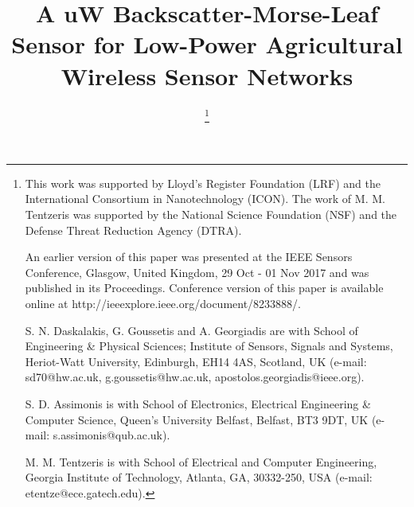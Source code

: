 \documentclass[journal]{IEEEtran}
\begin{document}
\title{A uW Backscatter-Morse-Leaf Sensor for Low-Power Agricultural Wireless Sensor Networks}


\author{

                             
\thanks{
This work was supported by Lloyd's Register Foundation (LRF) and the International Consortium in Nanotechnology (ICON). The work of M. M. Tentzeris was supported by the National Science Foundation (NSF) and the Defense Threat Reduction Agency (DTRA).

An earlier version of this paper was presented at the  IEEE Sensors Conference, Glasgow, United Kingdom, 29 Oct - 01 Nov 2017  and was published in its Proceedings. Conference version of  this paper is available online at http://ieeexplore.ieee.org/document/8233888/.

S. N. Daskalakis, G. Goussetis and A. Georgiadis  are with School of Engineering \& Physical Sciences;  Institute of Sensors, Signals and Systems, Heriot-Watt University, Edinburgh, EH14 4AS, Scotland,
UK (e-mail: sd70@hw.ac.uk, g.goussetis@hw.ac.uk, apostolos.georgiadis@ieee.org).

S. D. Assimonis is with School of Electronics, Electrical Engineering \& Computer Science, Queen's University Belfast, Belfast, BT3  9DT, UK (e-mail: s.assimonis@qub.ac.uk).

M. M. Tentzeris is with School of Electrical and Computer Engineering, Georgia Institute of Technology, Atlanta, GA, 30332-250, USA (e-mail: etentze@ece.gatech.edu).

}}

\maketitle
\end{document}
